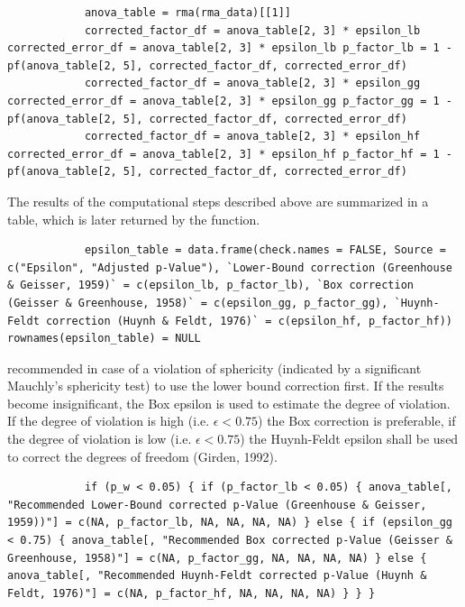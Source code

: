 \documentclass[11pt]{article}
\begin{document}
		
		\begin{lstlisting}
			anova_table = rma(rma_data)[[1]]
			corrected_factor_df = anova_table[2, 3] * epsilon_lb corrected_error_df = anova_table[2, 3] * epsilon_lb p_factor_lb = 1 - pf(anova_table[2, 5], corrected_factor_df, corrected_error_df)
			corrected_factor_df = anova_table[2, 3] * epsilon_gg corrected_error_df = anova_table[2, 3] * epsilon_gg p_factor_gg = 1 - pf(anova_table[2, 5], corrected_factor_df, corrected_error_df)
			corrected_factor_df = anova_table[2, 3] * epsilon_hf corrected_error_df = anova_table[2, 3] * epsilon_hf p_factor_hf = 1 - pf(anova_table[2, 5], corrected_factor_df, corrected_error_df)
		\end{lstlisting}
		
		The results of the computational steps described above are summarized in a table, which is later returned by the function.
		
		\begin{lstlisting}
			epsilon_table = data.frame(check.names = FALSE, Source = c("Epsilon", "Adjusted p-Value"), `Lower-Bound correction (Greenhouse & Geisser, 1959)` = c(epsilon_lb, p_factor_lb), `Box correction (Geisser & Greenhouse, 1958)` = c(epsilon_gg, p_factor_gg), `Huynh-Feldt correction (Huynh & Feldt, 1976)` = c(epsilon_hf, p_factor_hf)) rownames(epsilon_table) = NULL
		\end{lstlisting}
		
		\cite{greenhouse1959methods} recommended in case of a violation of sphericity (indicated by a significant Mauchly's sphericity test) to use the lower bound correction first. If the results become insignificant, the Box epsilon is used to estimate the degree of violation. If the degree of violation is high (i.e. $\epsilon < 0.75$) the Box correction is preferable, if the degree of violation is low (i.e. $\epsilon < 0.75$) the Huynh-Feldt epsilon shall be used to correct the degrees of freedom (Girden, 1992).
		
		\begin{lstlisting}
			if (p_w < 0.05) { if (p_factor_lb < 0.05) { anova_table[, "Recommended Lower-Bound corrected p-Value (Greenhouse & Geisser, 1959))"] = c(NA, p_factor_lb, NA, NA, NA, NA) } else { if (epsilon_gg < 0.75) { anova_table[, "Recommended Box corrected p-Value (Geisser & Greenhouse, 1958)"] = c(NA, p_factor_gg, NA, NA, NA, NA) } else { anova_table[, "Recommended Huynh-Feldt corrected p-Value (Huynh & Feldt, 1976)"] = c(NA, p_factor_hf, NA, NA, NA, NA) } } }	
		\end{lstlisting}
\end{document}
